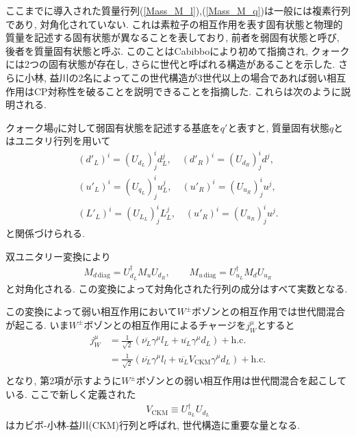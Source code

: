 ここまでに導入された質量行列(\ref{Mass_M_l}),(\ref{Mass_M_q})は一般には複素行列であり, 対角化されていない.
これは素粒子の相互作用を表す固有状態と物理的質量を記述する固有状態が異なることを表しており, 前者を弱固有状態と呼び, 後者を質量固有状態と呼ぶ.
このことはCabibbo\cite{cabibbo_unitary_1963}により初めて指摘され, クォークには2つの固有状態が存在し, さらに世代と呼ばれる構造があることを示した.
さらに小林, 益川\cite{kobayashi_cp-violation_1973}の2名によってこの世代構造が3世代以上の場合であれば弱い相互作用はCP対称性を破ることを説明できることを指摘した.
これらは次のように説明される.

クォーク場$q$に対して弱固有状態を記述する基底を$q'$と表すと, 質量固有状態$q$とはユニタリ行列を用いて
\begin{align}
  (d'_{L})^i = (U_{d_L})^i_j d_L^j,\quad (d'_{R})^i = (U_{d_R})^i_j d^j,\nonumber\\
  (u'_{L})^i = (U_{q_L})^i_j u_L^j,\quad (u'_{R})^i = (U_{u_R})^i_j u^j,\nonumber\\
  (L'_{L})^i = (U_{L_L})^i_j L_L^j,\quad (u'_{R})^i = (U_{u_R})^i_j u^j.\nonumber
\end{align}
と関係づけられる.

双ユニタリー変換により
\begin{align}
  M_{d\,\mathrm{diag}} = U_{d_L}^\dagger M_u U_{d_R},\qquad
  M_{u\,\mathrm{diag}} = U_{u_L}^\dagger M_d U_{u_R} \nonumber
\end{align}
と対角化される.
この変換によって対角化された行列の成分はすべて実数となる.

この変換によって弱い相互作用において$W^\pm$ボゾンとの相互作用では世代間混合が起こる.
いま$W^\pm$ボゾンとの相互作用によるチャージを$j_W^\mu$とすると
\begin{align}
  j_W^\mu &= \frac{1}{\sqrt{2}}\left(\overline{\nu_L} \gamma^\mu l_L + \overline{u_L}\gamma^\mu d_L\right) + \mathrm{h.c.} \nonumber\\
          &= \frac{1}{\sqrt{2}}\left(\overline{\nu_L} \gamma^\mu l_l + \overline{u_L}V_{\mathrm{CKM}}\gamma^\mu d_L\right) +\mathrm{h.c.} \nonumber\\
\end{align}
となり, 第2項が示すように$W^\pm$ボゾンとの弱い相互作用は世代間混合を起こしている.
ここで新しく定義された
\begin{align}
  V_{\mathrm{CKM}}\equiv U_{u_L}^\dagger U_{d_L}
\end{align}
はカビボ-小林-益川(CKM)行列と呼ばれ, 世代構造に重要な量となる.

